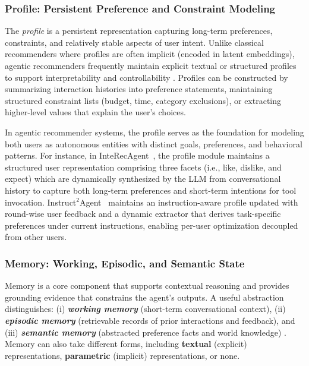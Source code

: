 \subsubsection{\textbf{Profile: Persistent Preference and Constraint Modeling}}\label{subsubsec:agent_rec_profile}

{The \emph{profile} is a persistent representation capturing long-term preferences, constraints, and relatively stable aspects of user intent. Unlike classical recommenders where profiles are often implicit (encoded in latent embeddings), agentic recommenders frequently maintain explicit textual or structured profiles to support interpretability and controllability \cite{huang2024interecagent,tang2025interactive}. Profiles can be constructed by summarizing interaction histories into preference statements, maintaining structured constraint lists (budget, time, category exclusions), or extracting higher-level values that explain the user’s choices.}


{
In agentic recommender systems, the profile serves as the foundation for modeling both users as autonomous entities with distinct goals, preferences, and behavioral patterns.
For instance, in InteRecAgent~\cite{huang2024interecagent}, the profile module maintains a structured user representation comprising three facets (i.e., like, dislike, and expect) which are dynamically synthesized by the LLM from conversational history to capture both long-term preferences and short-term intentions for tool invocation.
Instruct$^2$Agent~\cite{xu2025iagent}  maintains an instruction-aware profile updated with round-wise user feedback and a dynamic extractor that derives task-specific preferences under current instructions, enabling per-user optimization decoupled from other users.
}

\subsubsection{\textbf{Memory: Working, Episodic, and Semantic State}}\label{subsubsec:agent_rec_memory}
{Memory is a core component that supports contextual reasoning and provides grounding evidence that constrains the agent’s outputs. A useful abstraction distinguishes: (i) \textbf{\textit{working memory}} (short-term conversational context), (ii) \emph{\textbf{episodic memory}} (retrievable records of prior interactions and feedback), and (iii) \emph{\textbf{semantic memory}} (abstracted preference facts and world knowledge) \cite{wang2024recmind,liu2025agentcf++}.} 
Memory can also take different forms, including \textbf{textual} (explicit) representations, \textbf{parametric} (implicit) representations, or none.



